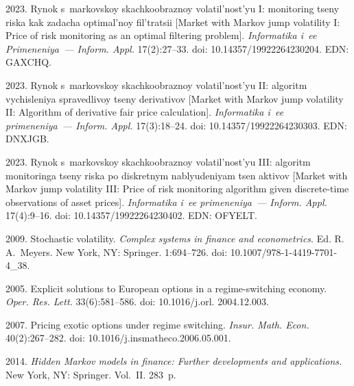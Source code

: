   \begin{multicols}{2}

\renewcommand{\bibname}{\protect\rmfamily References}

{\small\frenchspacing
 {%
 \begin{thebibliography}{99} 

 2023. 
Rynok s~markovskoy skachkoobraznoy volatil'nost'yu I: monitoring tseny riska kak zadacha optimal'noy fil'tratsii 
[Market with Markov jump volatility I: Price of risk monitoring as an optimal filtering problem]. 
\textit{Informatika i~ee Primeneniya~--- Inform. Appl.} 17(2):27--33. 
doi: 10.14357/19922264230204. EDN: GAXCHQ.

 2023. 
Rynok s~markovskoy skachkoobraznoy volatil'nost'yu II: algoritm vychisleniya spravedlivoy tseny derivativov 
[Market with Markov jump volatility II: Algorithm of derivative fair price calculation].
\textit{Informatika i~ee primeneniya~--- Inform. Appl.} 17(3):18--24. 
doi: 10.14357/19922264230303. EDN: DNXJGB.

 2023. 
Rynok s~markovskoy skachkoobraznoy volatil'nost'yu III: algoritm monitoringa tseny riska po diskretnym nablyudeniyam tsen aktivov 
[Market with Markov jump volatility III: Price of risk monitoring algorithm given discrete-time observations of asset prices]. 
\textit{Informatika i~ee primeneniya~--- Inform. Appl.} 17(4):9--16. 
doi: 10.14357/19922264230402. EDN: OFYELT.

 2009. 
Stochastic volatility. \textit{Complex systems in finance and econometrics}. Ed. R.\,A.~Meyers.  New York, NY: Springer. 1:694--726.
doi: 10.1007/978-1-4419-7701-4\_38.

 2005. 
Explicit solutions to European options in a regime-switching economy. 
\textit{Oper. Res. Lett.} 33(6):581--586.
doi: 10.1016/j.orl. 2004.12.003.

 2007. 
Pricing exotic options under regime switching. \textit{Insur. Math. Econ.} 40(2):267--282.
doi: 10.1016/j.insmatheco.2006.05.001.

 2014.
\textit{Hidden Markov models in finance: Further developments and applications.} New York, NY: Springer.  Vol.~II.  283~p.


\end{thebibliography}}}
\end{multicols}
